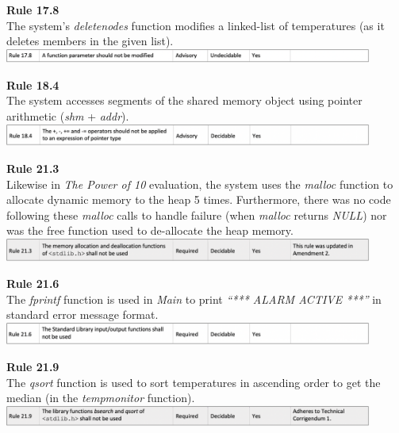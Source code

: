 \documentclass[a4paper]{article}
\begin{document}
\par \noindent \textbf{Rule 17.8} \\[1\baselineskip]
The system’s \emph{deletenodes} function modifies a linked-list of temperatures (as it deletes members in the given list). \\[1\baselineskip]
\includegraphics[width=12.12cm]{report-img/misra-c-8.png}

\newpage
\par \noindent \textbf{Rule 18.4} \\[1\baselineskip]
The system accesses segments of the shared memory object using pointer arithmetic (\emph{shm} + \emph{addr}). \\[1\baselineskip]
\includegraphics[width=12.12cm]{report-img/misra-c-9.png}

\par \noindent \textbf{Rule 21.3} \\[1\baselineskip]
Likewise in \emph{The Power of 10} evaluation, the system uses the \emph{malloc} function to allocate dynamic memory to the heap 5 times. Furthermore, there was no code following these \emph{malloc} calls to handle failure (when \emph{malloc} returns \emph{NULL}) nor was the free function used to de-allocate the heap memory. \\[1\baselineskip]
\includegraphics[width=12.12cm]{report-img/misra-c-10.png}

\par \noindent \textbf{Rule 21.6} \\[1\baselineskip]
The \emph{fprintf} function is used in \emph{Main} to print \emph{“*** ALARM ACTIVE ***”} in standard error message format. \\[1\baselineskip]
\includegraphics[width=12.12cm]{report-img/misra-c-11.png}

\par \noindent \textbf{Rule 21.9} \\[1\baselineskip]
The \emph{qsort} function is used to sort temperatures in ascending order to get the median (in the \emph{tempmonitor} function). \\[1\baselineskip]
\includegraphics[width=12.12cm]{report-img/misra-c-12.png}
\end{document}
